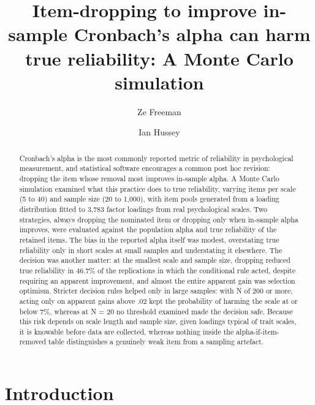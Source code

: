 \documentclass[
  nonatbib,
  authoryear,
  preprint]{elsarticle}
\begin{document}
\begin{frontmatter}
\title{Item-dropping to improve in-sample Cronbach's alpha can harm true
reliability: A Monte Carlo simulation}
\author[1,2]{Ze Freeman%
%
}

\author[1]{Ian Hussey%
%
}




        
\begin{abstract}
Cronbach's alpha is the most commonly reported metric of reliability in
psychological measurement, and statistical software encourages a common
post hoc revision: dropping the item whose removal most improves
in-sample alpha. A Monte Carlo simulation examined what this practice
does to true reliability, varying items per scale (5 to 40) and sample
size (20 to 1,000), with item pools generated from a loading
distribution fitted to 3,783 factor loadings from real psychological
scales. Two strategies, always dropping the nominated item or dropping
only when in-sample alpha improves, were evaluated against the
population alpha and true reliability of the retained items. The bias in
the reported alpha itself was modest, overstating true reliability only
in short scales at small samples and understating it elsewhere. The
decision was another matter: at the smallest scale and sample size,
dropping reduced true reliability in 46.7\% of the replications in which
the conditional rule acted, despite requiring an apparent improvement,
and almost the entire apparent gain was selection optimism. Stricter
decision rules helped only in large samples: with N of 200 or more,
acting only on apparent gains above .02 kept the probability of harming
the scale at or below 7\%, whereas at N = 20 no threshold examined made
the decision safe. Because this risk depends on scale length and sample
size, given loadings typical of trait scales, it is knowable before data
are collected, whereas nothing inside the alpha-if-item-removed table
distinguishes a genuinely weak item from a sampling artefact.
\end{abstract}





\end{frontmatter}
    

\section{Introduction}\label{introduction}
\end{document}
